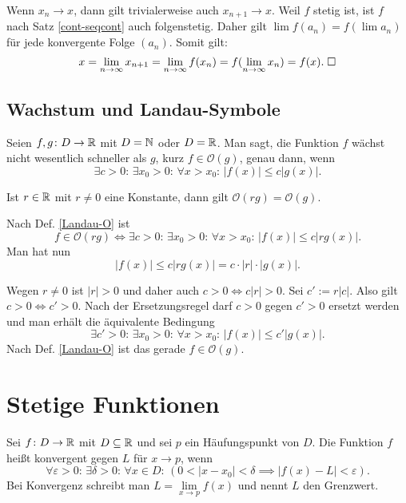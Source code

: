 \begin{Beweis}
Wenn $x_n\to x$, dann gilt trivialerweise auch $x_{n+1}\to x$.
Weil $f$ stetig ist, ist $f$ nach Satz \ref{cont-seqcont}
auch folgenstetig. Daher gilt $\lim f(a_n) = f(\lim a_n)$ für jede
konvergente Folge $(a_n)$. Somit gilt:
\[x=\lim_{n\to\infty} x_{n+1} = \lim_{n\to\infty} f(x_n)
= f(\lim_{n\to\infty} x_n) = f(x).\;\square\]
\end{Beweis}

\subsection{Wachstum und Landau-Symbole}
\begin{Definition}\label{Landau-O}
Seien $f,g\colon D\to\mathbb R$ mit $D=\mathbb N$ oder $D=\mathbb R$. Man sagt, die
Funktion $f$ wächst nicht wesentlich schneller als $g$, kurz
$f\in\mathcal O(g)$, genau dann, wenn
\[\exists c{>}0\colon\,\exists x_0{>}0\colon\,\forall x{>}x_0\colon\, |f(x)|\le c|g(x)|.\]
\end{Definition}

\begin{Korollar}
Ist $r\in\mathbb R$ mit $r\ne 0$ eine Konstante, dann gilt
$\mathcal O(rg)=\mathcal O(g)$.
\end{Korollar}
\begin{Beweis}
Nach Def. \ref{Landau-O} ist
\[f\in\mathcal O(rg) \iff 
\exists c{>}0\colon\,\exists x_0{>}0\colon\,\forall x{>}x_0\colon\,|f(x)|\le c|rg(x)|.\]
Man hat nun
\[|f(x)|\le c|rg(x)| = c\cdot |r|\cdot |g(x)|.\]
\end{Beweis}
Wegen $r\ne 0$ ist $|r|>0$ und daher auch $c>0\iff c|r|>0$. Sei
$c':=r|c|$. Also gilt $c>0\iff c'>0$. Nach der Ersetzungsregel
darf $c>0$ gegen $c'>0$ ersetzt werden und man erhält die
äquivalente Bedingung
\[\exists c'{>}0\colon\,\exists x_0{>}0\colon\,
\forall x{>}x_0\colon\,|f(x)|\le c'|g(x)|.\]
Nach Def. \ref{Landau-O} ist das gerade $f\in\mathcal O(g)$.\;\qedsymbol

\section{Stetige Funktionen}

\begin{Definition}\label{fn-lim}
Sei $f\colon D\to\mathbb R$ mit $D\subseteq\mathbb R$ und sei $p$ ein
Häufungspunkt von $D$. Die Funktion $f$ heißt konvergent
gegen $L$ für $x\to p$, wenn%
\[\forall \varepsilon{>}0\colon\,\exists \delta{>}0\colon\,\forall x{\in}D\colon\,
(0<|x-x_0|<\delta\implies |f(x)-L|<\varepsilon).\]
Bei Konvergenz schreibt man $L=\lim\limits_{x\to p} f(x)$ und nennt $L$ den Grenzwert.
\end{Definition}

